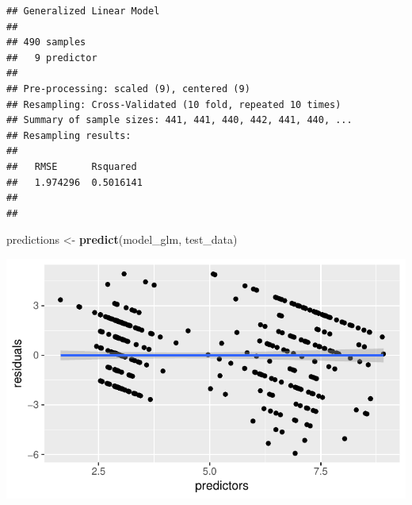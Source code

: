 \documentclass[]{article}
\newenvironment{Shaded}{\begin{snugshade}}{\end{snugshade}}
\newcommand{\KeywordTok}[1]{\textcolor[rgb]{0.13,0.29,0.53}{\textbf{{#1}}}}
\newcommand{\DataTypeTok}[1]{\textcolor[rgb]{0.13,0.29,0.53}{{#1}}}
\newcommand{\StringTok}[1]{\textcolor[rgb]{0.31,0.60,0.02}{{#1}}}
\newcommand{\CommentTok}[1]{\textcolor[rgb]{0.56,0.35,0.01}{\textit{{#1}}}}
\newcommand{\NormalTok}[1]{{#1}}
\begin{document}
\begin{verbatim}
## Generalized Linear Model 
## 
## 490 samples
##   9 predictor
## 
## Pre-processing: scaled (9), centered (9) 
## Resampling: Cross-Validated (10 fold, repeated 10 times) 
## Summary of sample sizes: 441, 441, 440, 442, 441, 440, ... 
## Resampling results:
## 
##   RMSE      Rsquared 
##   1.974296  0.5016141
## 
## 
\end{verbatim}

\begin{Shaded}
\begin{Highlighting}[]
\NormalTok{predictions <-}\StringTok{ }\KeywordTok{predict}\NormalTok{(model_glm, test_data)}
\end{Highlighting}
\end{Shaded}

\begin{Shaded}
\end{Shaded}

\includegraphics{webinar_code_files/figure-latex/residuals-1.pdf}
\end{document}
